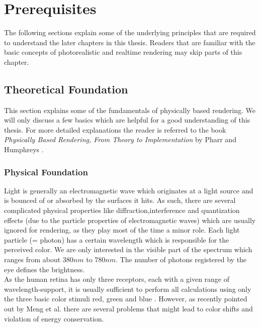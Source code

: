 \documentclass[thesis.tex]{subfiles}
\begin{document}
\chapter{Prerequisites}\label{chap:preq}
The following sections explain some of the underlying principles that are required to understand the later chapters in this thesis.
Readers that are familiar with the basic concepts of photorealistic and realtime rendering may skip parts of this chapter.


\section{Theoretical Foundation} \label{sec:preq:theo}
This section explains some of the fundamentals of physically based rendering.
We will only discuss a few basics which are helpful for a good understanding of this thesis.
For more detailed explanations the reader is referred to the book \emph{Physically Based Rendering, From Theory to Implementation} by Pharr and Humphreys \cite{bib:pbrt}.

\subsection{Physical Foundation}
Light is generally an electromagnetic wave which originates at a light source and is bounced of or absorbed by the surfaces it hits.
As such, there are several complicated physical properties like diffraction,interference and quantization effects (due to the particle properties of electromagnetic waves) which are usually ignored for rendering, as they play most of the time a minor role.
Each light particle (= photon) has a certain wavelength which is responsible for the perceived color.
We are only interested in the visible part of the spectrum which ranges from about $380nm$ to $780nm$.
The number of photons registered by the eye defines the brightness.
\\
As the human retina has only three receptors, each with a given range of wavelength-support, it is usually sufficient to perform all calculations using only the three basic color stimuli red, green and blue \cite{bib:colorscience}.
However, as recently pointed out by Meng et al. \cite{bib:spectrumrendering} there are several problems that might lead to color shifts and violation of energy conservation. 
\end{document}
